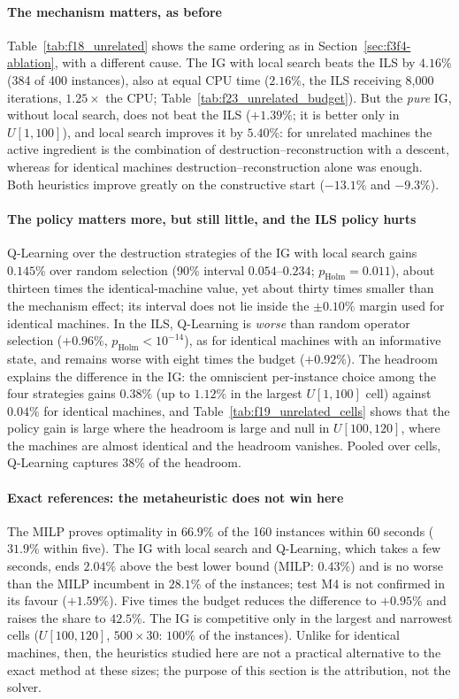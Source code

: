 \documentclass[final,3p,times,11pt,authoryear]{elsarticle}
\begin{document}
\paragraph{The mechanism matters, as before}
Table~\ref{tab:f18_unrelated} shows the same ordering as in
Section~\ref{sec:f3f4-ablation}, with a different cause. The IG with local search
beats the ILS by $4.16\%$ (384 of 400 instances), also at equal CPU time ($2.16\%$,
the ILS receiving 8{,}000 iterations, $1.25\times$ the CPU; Table~\ref{tab:f23_unrelated_budget}).
But the \emph{pure} IG, without local search, does not beat the ILS ($+1.39\%$;
it is better only in $U[1,100]$), and local search improves it by $5.40\%$: for
unrelated machines the active ingredient is the combination of destruction--reconstruction
with a descent, whereas for identical machines destruction--reconstruction
alone was enough. Both heuristics improve greatly on the constructive start
($-13.1\%$ and $-9.3\%$).

\paragraph{The policy matters more, but still little, and the ILS policy hurts}
Q-Learning over the destruction strategies of the IG with local search gains
$0.145\%$ over random selection (90\% interval $0.054$--$0.234$; $p_{\mathrm{Holm}}=0.011$), about thirteen times the
identical-machine value, yet about thirty times smaller than the mechanism
effect; its interval does not lie inside the $\pm0.10\%$ margin used for
identical machines.
In the ILS, Q-Learning is \emph{worse} than random operator selection ($+0.96\%$, $p_{\mathrm{Holm}}<10^{-14}$),
as for identical machines with an informative state, and remains worse with
eight times the budget ($+0.92\%$). The headroom explains the difference in the IG: the
omniscient per-instance choice among the four strategies gains $0.38\%$ (up
to $1.12\%$ in the largest $U[1,100]$ cell) against $0.04\%$ for identical machines, and
Table~\ref{tab:f19_unrelated_cells} shows that the policy gain is large where
the headroom is large and null in $U[100,120]$, where the machines are almost
identical and the headroom vanishes. Pooled over cells, Q-Learning captures
$38\%$ of the headroom.

\paragraph{Exact references: the metaheuristic does not win here}
The MILP proves optimality in $66.9\%$ of the 160 instances within 60 seconds
($31.9\%$ within five). The IG with local search and Q-Learning, which takes a few
seconds, ends $2.04\%$ above the best lower bound (MILP: $0.43\%$) and is no
worse than the MILP incumbent in $28.1\%$ of the instances; test M4 is not
confirmed in its favour ($+1.59\%$). Five times the budget reduces the
difference to $+0.95\%$ and raises the share to $42.5\%$. The IG is
competitive only in the largest and narrowest cells ($U[100,120]$, $500\times30$:
$100\%$ of the instances). Unlike for identical machines, then, the heuristics
studied here are not a practical alternative to the exact method at these sizes;
the purpose of this section is the attribution, not the solver.
\end{document}

